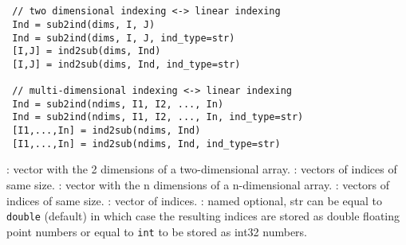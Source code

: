
\begin{mandesc}
   \\
   \\
\end{mandesc}

\begin{calling_sequence}
\begin{verbatim}
 // two dimensional indexing <-> linear indexing
 Ind = sub2ind(dims, I, J)
 Ind = sub2ind(dims, I, J, ind_type=str)
 [I,J] = ind2sub(dims, Ind)
 [I,J] = ind2sub(dims, Ind, ind_type=str)

 // multi-dimensional indexing <-> linear indexing
 Ind = sub2ind(ndims, I1, I2, ..., In)
 Ind = sub2ind(ndims, I1, I2, ..., In, ind_type=str)
 [I1,...,In] = ind2sub(ndims, Ind)
 [I1,...,In] = ind2sub(ndims, Ind, ind_type=str)
\end{verbatim}
\end{calling_sequence}

\begin{parameters}
  \begin{varlist}
   : vector with the 2 dimensions of a two-dimensional array.
   : vectors of indices of same size.
   : vector with the n dimensions of a n-dimensional array.
   : vectors of indices of same size.
   : vector of indices.
   : named optional, str can be equal to \verb"double" (default) in which case
          the resulting indices are stored as double floating point numbers or equal to  \verb"int"
          to be stored as int32 numbers.
  \end{varlist}
\end{parameters}

